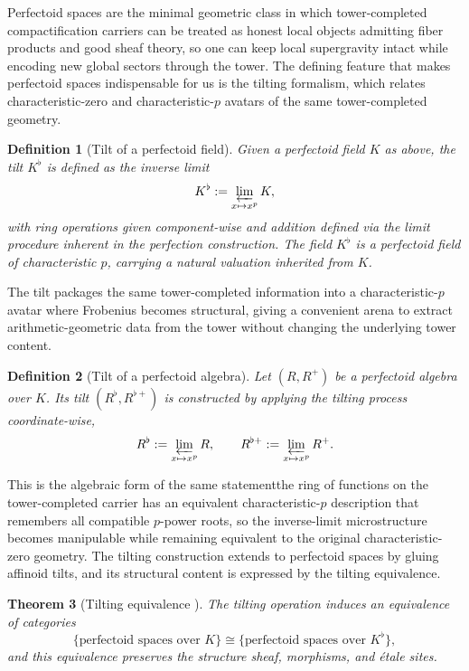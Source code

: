 \documentclass[11pt]{article}
\newtheorem{theorem}{Theorem}[section]
\newtheorem{definition}[theorem]{Definition}
\theoremstyle{remark}
\begin{document}
 Perfectoid spaces are the minimal geometric class in which tower-completed compactification carriers can be treated as honest local objects admitting fiber products and good sheaf theory, so one can keep local supergravity intact while encoding new global sectors through the tower. The defining feature that makes perfectoid spaces indispensable for us is the tilting formalism, which relates characteristic-zero and characteristic-\(p\) avatars of the same tower-completed geometry. \begin{definition}[Tilt of a perfectoid field]Given a perfectoid field \(K\) as above, the tilt \(K^\flat\) is defined as the inverse limit
\begin{equation}\label{8}
K^\flat:=\varprojlim_{x\mapsto x^p} K,
\end{equation}
with ring operations given component-wise and addition defined via the limit procedure inherent in the perfection construction. The field \(K^\flat\) is a perfectoid field of characteristic \(p\), carrying a natural valuation inherited from \(K\).\end{definition}
 The tilt packages the same tower-completed information into a characteristic-\(p\) avatar where Frobenius becomes structural, giving a convenient arena to extract arithmetic-geometric data from the tower without changing the underlying tower content. \begin{definition}[Tilt of a perfectoid algebra]Let \((R,R^+)\) be a perfectoid algebra over \(K\). Its tilt \((R^\flat,R^{\flat+})\) is constructed by applying the tilting process coordinate-wise,
\begin{equation}\label{9}
R^\flat:=\varprojlim_{x\mapsto x^p} R,\qquad R^{\flat+}:=\varprojlim_{x\mapsto x^p} R^+.
\end{equation}\end{definition}
 This is the algebraic form of the same statement\:the ring of functions on the tower-completed carrier has an equivalent characteristic-\(p\) description that remembers all compatible \(p\)-power roots, so the inverse-limit microstructure becomes manipulable while remaining equivalent to the original characteristic-zero geometry. The tilting construction extends to perfectoid spaces by gluing affinoid tilts, and its structural content is expressed by the tilting equivalence. \begin{theorem}[Tilting equivalence \cite{Scholze2012}]\label{thm:tilt}The tilting operation induces an equivalence of categories
\begin{equation}\label{10}
\{\text{perfectoid spaces over }K\}\cong \{\text{perfectoid spaces over }K^\flat\},
\end{equation}
and this equivalence preserves the structure sheaf, morphisms, and \'etale sites.\end{theorem}
\end{document}
